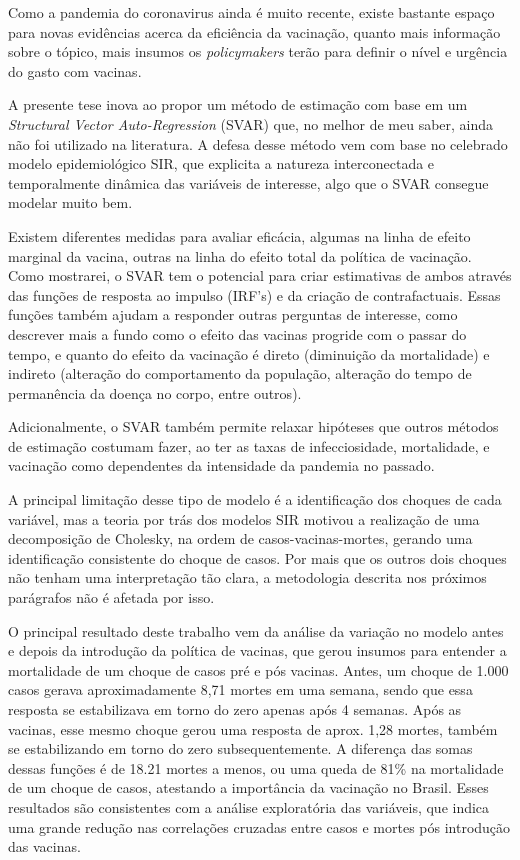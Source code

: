 \documentclass[
	12pt,				%
	oneside,			%
	a4paper,			%
	english,			%
	brazil				%
	hyperref = {colorlinks, citecolor=c1d, linkcolor=c2d, urlcolor=c3d, colorlinks}
	]{abntex2}
\newcounter{j}
\begin{document}
Como a pandemia do coronavirus ainda é muito recente, existe bastante espaço para novas evidências acerca da eficiência da vacinação, quanto mais informação sobre o tópico, mais insumos os \textit{policymakers} terão para definir o nível e urgência do gasto com vacinas.

A presente tese inova ao propor um método de estimação com base em um \textit{Structural Vector Auto-Regression} (SVAR) que, no melhor de meu saber, ainda não foi utilizado na literatura. A defesa desse método vem com base no celebrado modelo epidemiológico SIR, que explicita a natureza interconectada e temporalmente dinâmica das variáveis de interesse, algo que o SVAR consegue modelar muito bem.

Existem diferentes medidas para avaliar eficácia, algumas na linha de efeito marginal da vacina, outras na linha do efeito total da política de vacinação. Como mostrarei, o SVAR tem o potencial para criar estimativas de ambos através das funções de resposta ao impulso (IRF's) e da criação de contrafactuais. Essas funções também ajudam a responder outras perguntas de interesse, como descrever mais a fundo como o efeito das vacinas progride com o passar do tempo, e quanto do efeito da vacinação é direto (diminuição da mortalidade) e indireto (alteração do comportamento da população, alteração do tempo de permanência da doença no corpo, entre outros).

Adicionalmente, o SVAR também permite relaxar hipóteses que outros métodos de estimação costumam fazer, ao ter as taxas de infecciosidade, mortalidade, e vacinação como dependentes da intensidade da pandemia no passado.

A principal limitação desse tipo de modelo é a identificação dos choques de cada variável, mas a teoria por trás dos modelos SIR motivou a realização de uma decomposição de Cholesky, na ordem de casos-vacinas-mortes, gerando uma identificação consistente do choque de casos. Por mais que os outros dois choques não tenham uma interpretação tão clara, a metodologia descrita nos próximos parágrafos não é afetada por isso.

O principal resultado deste trabalho vem da análise da variação no modelo antes e depois da introdução da política de vacinas, que gerou insumos para entender a mortalidade de um choque de casos pré e pós vacinas. Antes, um choque de 1.000 casos gerava aproximadamente 8,71 mortes em uma semana, sendo que essa resposta se estabilizava em torno do zero apenas após 4 semanas. Após as vacinas, esse mesmo choque gerou uma resposta de aprox. 1,28 mortes, também se estabilizando em torno do zero subsequentemente. A diferença das somas dessas funções é de 18.21 mortes a menos, ou uma queda de 81\% na mortalidade de um choque de casos, atestando a importância da vacinação no Brasil. Esses resultados são consistentes com a análise exploratória das variáveis, que indica uma grande redução nas correlações cruzadas entre casos e mortes pós introdução das vacinas.
\end{document}
